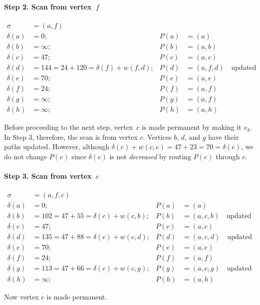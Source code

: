 \documentclass[10pt,]{book}
\theoremstyle{plain}
\theoremstyle{definition}
\theoremstyle{definition}
\theoremstyle{definition}
\theoremstyle{definition}
\numberwithin{equation}{section}
\newcommand{\amp}{&}
\begin{document}
\paragraph[{Step 2.  Scan from vertex~\(f\)}]{Step 2.  Scan from vertex~\(f\)}\hypertarget{paragraphs-2}{}
\hypertarget{p-210}{}%
%
\begin{align*}
\sigma\amp=(a,f)\amp\amp\\
\delta(a)\amp=0; \amp P(a)\amp=(a)\\
\delta(b)\amp=\infty; \amp P(b)\amp=(a,b)\\
\delta(c)\amp=47; \amp P(c)\amp=(a,c)\\
\delta(d)\amp=144 = 24 + 120 = \delta(f)+w(f,d); \amp P(d)\amp=(a,f,d)\quad\text{updated} \\
\delta(e)\amp=70; \amp P(e)\amp=(a,e)\\
\delta(f)\amp=24; \amp P(f)\amp=(a,f)\\
\delta(g)\amp=\infty; \amp P(g)\amp=(a,f)\\
\delta(h)\amp=\infty; \amp P(h)\amp=(a,h)
\end{align*}
%
\par
\hypertarget{p-211}{}%
Before proceeding to the next step, vertex~\(c\) is made permanent by making it \(v_3\). In Step 3, therefore, the scan is from vertex \(c\). Vertices \(b\), \(d\), and \(g\) have their paths updated. However, although \(\delta(c) + w(c,e) = 47+23=70=\delta(e)\), we do not change \(P(e)\) since \(\delta(e)\) is not \emph{decreased} by routing \(P(e)\) through \(c\).%
\typeout{************************************************}
\typeout{************************************************}
\paragraph[{Step 3.  Scan from vertex~\(c\)}]{Step 3.  Scan from vertex~\(c\)}\hypertarget{paragraphs-3}{}
\hypertarget{p-212}{}%
%
\begin{align*}
\sigma\amp=(a,f,c)\\
\delta(a)\amp=0; \amp P(a)\amp=(a)\\
\delta(b)\amp=102=47+55= \delta(c)+w(c,b); \amp P(b)\amp=(a,c,b)\quad\text{updated}\\
\delta(c)\amp=47; \amp P(c)\amp=(a,c)\\
\delta(d)\amp=135=47+88 = \delta(c)+w(c,d); \amp P(d)\amp=(a,c,d)\quad\text{updated} \\
\delta(e)\amp=70; \amp P(e)\amp=(a,e)\\
\delta(f)\amp=24; \amp P(f)\amp=(a,f)\\
\delta(g)\amp=113=47+66= \delta(c)+w(c,g); \amp P(g)\amp=(a,c,g)\quad\text{updated} \\
\delta(h)\amp=\infty; \amp P(h)\amp=(a,h)
\end{align*}
%
\par
\hypertarget{p-213}{}%
Now vertex \(e\) is made permanent.%
\typeout{************************************************}
\typeout{************************************************}
\end{document}
